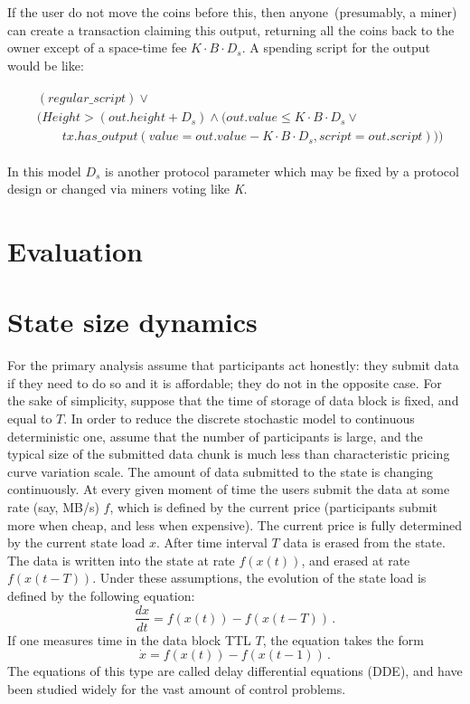 \documentclass[]{llncs}   %
\begin{document}
If the user do not move the coins before this, then anyone~(presumably, a miner) can create a transaction claiming this output, returning all the coins back to the owner except of a space-time fee ${K \cdot B \cdot D_{s}}$. A spending script for the output would be like:

\begin{align}
\begin{split}
&(regular\_script) \lor \\
&(Height > (out.height + D_s) \land (out.value \le K \cdot B \cdot D_s \lor \\  
&\qquad tx.has\_output(value = out.value - K \cdot B \cdot D_s, script = out.script)))
\end{split}
\end{align}

In this model $D_s$ is another protocol parameter which may be fixed by a protocol design or changed via miners voting like \textit{K}.


\section{Evaluation}




\appendix
\section{State size dynamics}
For the primary analysis assume that participants act honestly: they submit
data if they need to do so and it is affordable; they do not in the opposite
case. For the sake of simplicity, suppose that the time of storage of data
block is fixed, and equal to $T$. In order to reduce the discrete stochastic
model to continuous deterministic one, assume that the number of participants
is large, and the typical size of the submitted data chunk is much less than
characteristic pricing curve variation scale. The amount of data submitted to
the state is changing continuously. At every given moment of time the users
submit the data at some rate (say, MB/s) $f$, which is defined by the current
price (participants submit more when cheap, and less when expensive). The
current price is fully determined by the current state load $x$. After time
interval $T$ data is erased from the state. The data is written into the state
at rate $f(x(t))$, and erased at rate $f(x(t-T))$. Under these assumptions,
the evolution of the state load is defined by the following equation:
\begin{equation}
    \frac{dx}{dt} = f(x(t))-f(x(t-T))\,.
    \label{eq:dde0}
\end{equation}
If one measures time in the data block TTL $T$, the equation takes the form
\begin{equation}
    \dot{x} = f(x(t))-f(x(t-1))\,.
    \label{eq:dde1}
\end{equation}
The equations of this type are called delay differential equations (DDE), and have
been studied widely for the vast amount of control problems.
\end{document}
